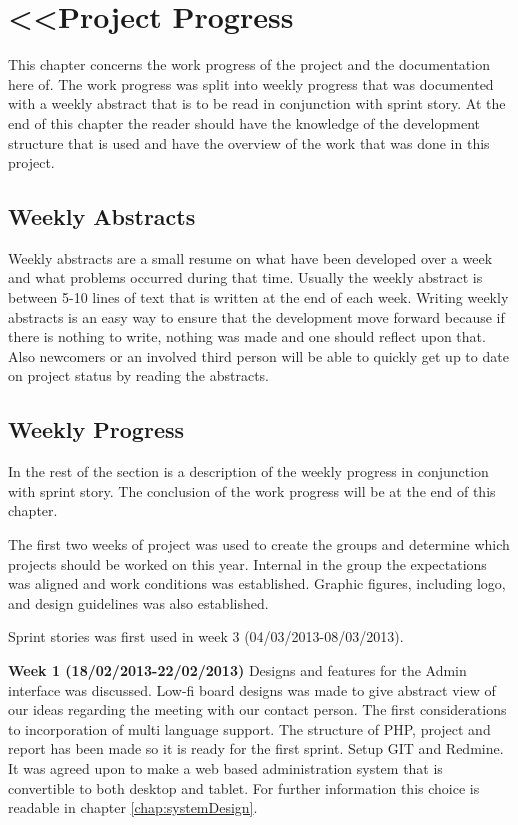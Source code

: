\chapter{<<Project Progress}
\label{sec:projectProgress}
This chapter concerns the work progress of the project and the documentation here of. 
The work progress was split into weekly progress that was documented with a weekly abstract that is to be read in conjunction with sprint story.  
At the end of this chapter the reader should have the knowledge of the development structure that is used and have the overview of the work that was done in this project. 


\section{Weekly Abstracts}      
\label{subsec:weeklyAbstracts}
Weekly abstracts are a small resume on what have been developed over a week and what problems occurred during that time. 
Usually the weekly abstract is between 5-10 lines of text that is written at the end of each week. 
Writing weekly abstracts is an easy way to ensure that the development move forward because if there is nothing to write, nothing was made and one should reflect upon that.
Also newcomers or an involved third person will be able to quickly get up to date on project status by reading the abstracts.         

\section{Weekly Progress}
\label{subsec:weeklyProgress}
In the rest of the section is a description of the weekly progress in conjunction with sprint story.
The conclusion of the work progress will be at the end of this chapter. 

The first two weeks of project was used to create the groups and determine which projects should be worked on this year.  
Internal in the group the expectations was aligned and work conditions was established.
Graphic figures, including logo, and design guidelines was also established.      

Sprint stories was first used in week 3 (04/03/2013-08/03/2013).   

\textbf{Week 1 (18/02/2013-22/02/2013)} 
Designs and features for the Admin interface was discussed.
Low-fi board designs was made to give abstract view of our ideas regarding the meeting with our contact person.   
The first considerations to incorporation of multi language support.
The structure of PHP, project and report has been made so it is ready for the first sprint.
Setup GIT and Redmine.
It was agreed upon to make a web based administration system that is convertible to both desktop and tablet.  
For further information this choice is readable in chapter \vref{chap:systemDesign}.

